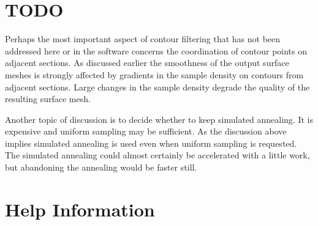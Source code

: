 \documentclass[12pt]{article}
\begin{document}
\section{TODO}

Perhaps the most important aspect of contour filtering that has not
been addressed here or in the software concerns the coordination
of contour points on adjacent sections. As discussed earlier
the smoothness of the output surface meshes is strongly affected by
gradients in the sample density on contours from adjacent sections.
Large changes in the sample density degrade the quality of the resulting
surface mesh.

Another topic of discussion is to decide whether to keep simulated
annealing. It is expensive and uniform sampling may be sufficient. As the
discussion above implies simulated annealing is used even when uniform
sampling is requested. The simulated annealing could almost certainly
be accelerated with a little work, but abandoning the annealing would
be faster still.

\section{Help Information}

\begin{alltt}
\tiny

\end{alltt}

{}

\end{document}
